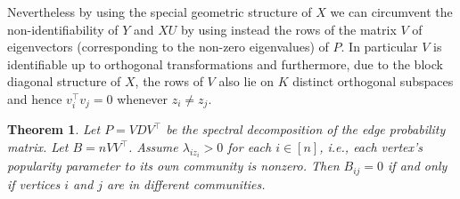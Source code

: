 \documentclass[
  11pt,
]{article}
\newtheorem{theorem}{Theorem}[section]
\theoremstyle{definition}
\theoremstyle{definition}
\theoremstyle{definition}
\theoremstyle{definition}
\theoremstyle{remark}
\begin{document}
Nevertheless by using the special geometric structure of \(X\) we can circumvent the
non-identifiability of \(Y\) and \(XU\) by using instead the rows of the
matrix \(V\) of eigenvectors (corresponding to the non-zero eigenvalues) of \(P\). In particular \(V\) is identifiable
up to orthogonal transformations and furthermore, due to the block
diagonal structure of \(X\), the rows of \(V\) also lie on \(K\) distinct orthogonal
subspaces and hence \(v_i^{\top} v_j = 0\) whenever \(z_i \not = z_j\).

\begin{theorem}
\label{thm:osc-p}
Let $P = V D V^\top$ be the spectral decomposition 
of the edge probability matrix. 
Let $B = n V V^\top$. 
Assume $\lambda_{i z_i} > 0$ for each $i \in [n]$, 
i.e., each vertex's popularity parameter to its own community is nonzero. 
Then $B_{ij} = 0$ if and only if 
vertices $i$ and $j$ are in different communities.
\end{theorem}
\end{document}

